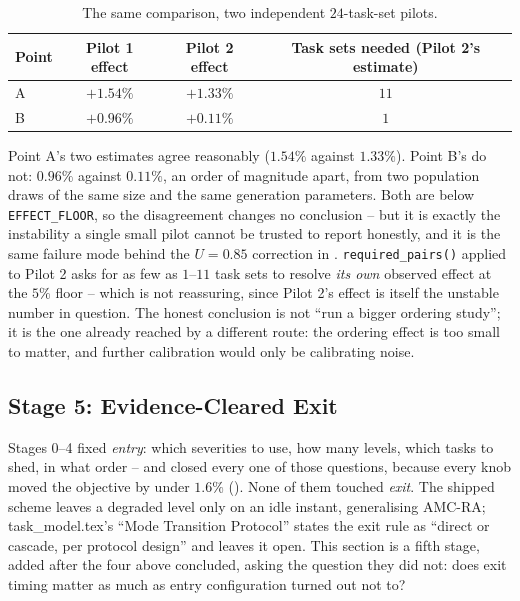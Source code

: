 \begin{table}[h]
\centering
\caption{The same comparison, two independent $24$-task-set pilots.}
\label{tab:pilot-variance}
\begin{tabular}{lccc}
\toprule
Point & Pilot 1 effect & Pilot 2 effect & Task sets needed (Pilot 2's estimate) \\
\midrule
A & $+1.54\%$ & $+1.33\%$ & $11$ \\
B & $+0.96\%$ & $+0.11\%$ & $1$ \\
\bottomrule
\end{tabular}
\end{table}

\noindent Point A's two estimates agree reasonably ($1.54\%$ against $1.33\%$).
Point B's do not: $0.96\%$ against $0.11\%$, an order of magnitude apart, from
two population draws of the same size and the same generation parameters. Both
are below \texttt{EFFECT\_FLOOR}, so the disagreement changes no conclusion --
but it is exactly the instability a single small pilot cannot be trusted to
report honestly, and it is the same failure mode behind the $U=0.85$ correction
in . \texttt{required\_pairs()} applied to Pilot
2 asks for as few as $1$--$11$ task sets to resolve \emph{its own} observed
effect at the $5\%$ floor -- which is not reassuring, since Pilot 2's effect is
itself the unstable number in question. The honest conclusion is not ``run a
bigger ordering study''; it is the one  already
reached by a different route: the ordering effect is too small to matter, and
further calibration would only be calibrating noise.

\subsection{Stage 5: Evidence-Cleared Exit}
\label{sec:exit-results}

Stages 0--4 fixed \emph{entry}: which severities to use, how many levels, which
tasks to shed, in what order -- and closed every one of those questions,
because every knob moved the objective by under $1.6\%$
(). None of them touched \emph{exit}. The shipped
scheme leaves a degraded level only on an idle instant, generalising AMC-RA;
task\_model.tex's ``Mode Transition Protocol'' states the exit rule as
``direct or cascade, per protocol design'' and leaves it open. This section is
a fifth stage, added after the four above concluded, asking the question they
did not: does exit timing matter as much as entry configuration turned out not
to?

